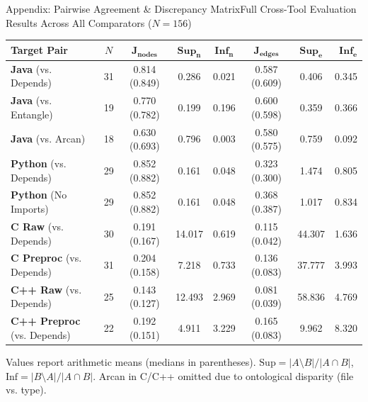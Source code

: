 \documentclass[aspectratio=169,10pt]{beamer}
\begin{document}
\begin{frame}[noframenumbering]{Appendix: Pairwise Agreement \& Discrepancy Matrix}{Full Cross-Tool Evaluation Results Across All Comparators ($N=156$)}
  \centering
  \vspace{-0.2em}
  {\scriptsize
  \begin{tabular*}{\linewidth}{@{\extracolsep{\fill}}lccccccr@{}}
    \toprule
    \textbf{Target Pair} & $N$ & $\mathbf{J_{\text{nodes}}}$ & $\mathbf{\text{Sup}_{\text{n}}}$ & $\mathbf{\text{Inf}_{\text{n}}}$ & $\mathbf{J_{\text{edges}}}$ & $\mathbf{\text{Sup}_{\text{e}}}$ & $\mathbf{\text{Inf}_{\text{e}}}$ \\
    \midrule
    \textbf{Java} (vs. Depends)       & 31 & 0.814 (0.849) & 0.286  & 0.021  & 0.587 (0.609) & 0.406  & 0.345 \\
    \textbf{Java} (vs. Entangle)      & 19 & 0.770 (0.782) & 0.199  & 0.196  & 0.600 (0.598) & 0.359  & 0.366 \\
    \textbf{Java} (vs. Arcan)         & 18 & 0.630 (0.693) & 0.796  & 0.003  & 0.580 (0.575) & 0.759  & 0.092 \\
    \midrule
    \textbf{Python} (vs. Depends)     & 29 & 0.852 (0.882) & 0.161  & 0.048  & 0.323 (0.300) & 1.474  & 0.805 \\
    \textbf{Python} (No Imports)      & 29 & 0.852 (0.882) & 0.161  & 0.048  & 0.368 (0.387) & 1.017  & 0.834 \\
    \midrule
    \textbf{C Raw} (vs. Depends)      & 30 & 0.191 (0.167) & 14.017 & 0.619  & 0.115 (0.042) & 44.307 & 1.636 \\
    \textbf{C Preproc} (vs. Depends)  & 31 & 0.204 (0.158) & 7.218  & 0.733  & 0.136 (0.083) & 37.777 & 3.993 \\
    \textbf{C++ Raw} (vs. Depends)    & 25 & 0.143 (0.127) & 12.493 & 2.969  & 0.081 (0.039) & 58.836 & 4.769 \\
    \textbf{C++ Preproc} (vs. Depends)& 22 & 0.192 (0.151) & 4.911  & 3.229  & 0.165 (0.083) & 9.962  & 8.320 \\
    \bottomrule
  \end{tabular*}}\par
  \vspace{0.4em}
  {\tiny\color{cookieMuted}Values report arithmetic means (medians in parentheses). $\text{Sup} = |A \setminus B| / |A \cap B|$, $\text{Inf} = |B \setminus A| / |A \cap B|$. Arcan in C/C++ omitted due to ontological disparity (file vs. type).\par}
\end{frame}
\end{document}
